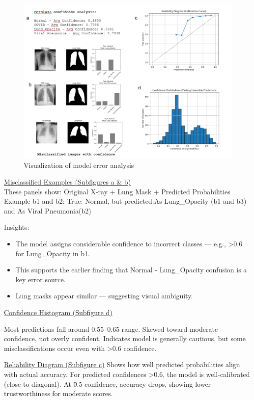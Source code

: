 \documentclass{article}
\begin{document}
\begin{figure}%
    \centering
    \includegraphics[width=1.0\linewidth]{error_analysis.png}
    \caption{Visualization of model error analysis}
    \label{fig:error_analysis}
\end{figure}

\underline{Misclassified Examples (Subfigures a \& b)}\\

These panels show:
Original X-ray + Lung Mask + Predicted Probabilities
Example b1 and b2:
True: Normal, but predicted:As Lung\_Opacity (b1 and b3) and As Viral Pneumonia(b2)

Insights:
\begin{itemize}
    \item The model assigns considerable confidence to incorrect classes — e.g., >0.6 for Lung\_Opacity in b1.
    \item This supports the earlier finding that Normal - Lung\_Opacity confusion is a key error source.
    \item Lung masks appear similar — suggesting visual ambiguity.
\end{itemize}

\underline{Confidence Histogram (Subfigure d)}

Most predictions fall around 0.55–0.65 range.
Skewed toward moderate confidence, not overly confident.
Indicates model is generally cautious, but some misclassifications occur even with >0.6 confidence.

\underline{Reliability Diagram (Subfigure c)}
Shows how well predicted probabilities align with actual accuracy.
For predicted confidences >0.6, the model is well-calibrated (close to diagonal).
At \~0.5 confidence, accuracy drops, showing lower trustworthiness for moderate scores.
\end{document}

